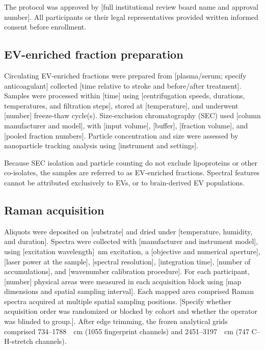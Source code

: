 \documentclass[preprint,12pt]{elsarticle}
\begin{document}
The protocol was approved by {\color{red}[full institutional review board name and approval number]}. All participants or their legal representatives provided written informed consent before enrollment.

\subsection{EV-enriched fraction preparation} 
\label{subsec:ev_isolation}

Circulating EV-enriched fractions were prepared from {\color{red}[plasma/serum; specify anticoagulant]} collected {\color{red}[time relative to stroke and before/after treatment]}. Samples were processed within {\color{red}[time]} using {\color{red}[centrifugation speeds, durations, temperatures, and filtration steps]}, stored at {\color{red}[temperature]}, and underwent {\color{red}[number]} freeze-thaw cycle(s). Size-exclusion chromatography (SEC) used {\color{red}[column manufacturer and model]}, with {\color{red}[input volume]}, {\color{red}[buffer]}, {\color{red}[fraction volume]}, and {\color{red}[pooled fraction numbers]}. Particle concentration and size were assessed by nanoparticle tracking analysis using {\color{red}[instrument and settings]}.

Because SEC isolation and particle counting do not exclude lipoproteins or other co-isolates, the samples are referred to as EV-enriched fractions. Spectral features cannot be attributed exclusively to EVs, or to brain-derived EV populations.

\subsection{Raman acquisition} 
\label{subsec:acquisition}

Aliquots were deposited on {\color{red}[substrate]} and dried under {\color{red}[temperature, humidity, and duration]}. Spectra were collected with {\color{red}[manufacturer and instrument model]}, using {\color{red}[excitation wavelength]}~nm excitation, a {\color{red}[objective and numerical aperture]}, {\color{red}[laser power at the sample]}, {\color{red}[spectral resolution]}, {\color{red}[integration time]}, {\color{red}[number of accumulations]}, and {\color{red}[wavenumber calibration procedure]}. For each participant, {\color{red}[number]} physical areas were measured in each acquisition block using {\color{red}[map dimensions and spatial sampling interval]}. Each mapped area comprised Raman spectra acquired at multiple spatial sampling positions.
{\color{red}[Specify whether acquisition order was randomized or blocked by cohort and whether the operator was blinded to group.]}.
After edge trimming, the frozen analytical grids comprised 734--1788~\si{\per\centi\metre} (1055 fingerprint channels) and 2451--3197~\si{\per\centi\metre} (747 C--H-stretch channels).
\end{document}
